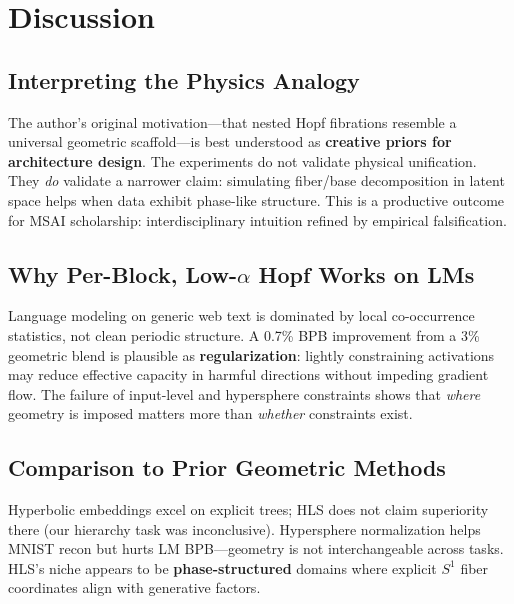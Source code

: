 \documentclass[11pt,twocolumn]{article}
\begin{document}
\section{Discussion}
\label{sec:discussion}

\subsection{Interpreting the Physics Analogy}

The author's original motivation---that nested Hopf fibrations resemble a universal geometric scaffold---is best understood as \textbf{creative priors for architecture design}. The experiments do not validate physical unification. They \emph{do} validate a narrower claim: simulating fiber/base decomposition in latent space helps when data exhibit phase-like structure. This is a productive outcome for MSAI scholarship: interdisciplinary intuition refined by empirical falsification.

\subsection{Why Per-Block, Low-$\alpha$ Hopf Works on LMs}

Language modeling on generic web text is dominated by local co-occurrence statistics, not clean periodic structure. A 0.7\% BPB improvement from a 3\% geometric blend is plausible as \textbf{regularization}: lightly constraining activations may reduce effective capacity in harmful directions without impeding gradient flow. The failure of input-level and hypersphere constraints shows that \emph{where} geometry is imposed matters more than \emph{whether} constraints exist.

\subsection{Comparison to Prior Geometric Methods}

Hyperbolic embeddings excel on explicit trees; HLS does not claim superiority there (our hierarchy task was inconclusive). Hypersphere normalization helps MNIST recon but hurts LM BPB---geometry is not interchangeable across tasks. HLS's niche appears to be \textbf{phase-structured} domains where explicit $S^1$ fiber coordinates align with generative factors.
\end{document}
